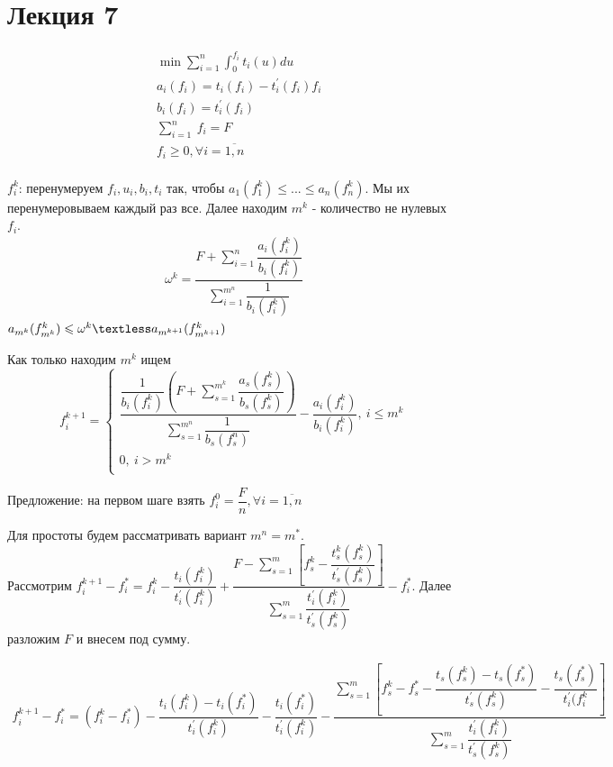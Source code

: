 \documentclass[12pt,a4paper,titlepage,oneside]{book}
\theoremstyle{definition}
\theoremstyle{plain}
\theoremstyle{remark}
\theoremstyle{remark}
\theoremstyle{plain}
\theoremstyle{plain}
\begin{document}
\chapter{Лекция 7}
\begin{align*}
&\min \sum\limits_{i=1}^n \int_{0}^{f_i} t_i(u)du\\
&a_i(f_i)=t_i(f_i)-t_i^{\prime} (f_i)f_i\\
&b_i(f_i)=t_i^{\prime} (f_i)\\
&\sum\limits_{i=1}^n\ f_i=F\\
&f_i \geqslant 0, \forall i= \overline{1,n}\\
\end{align*}

$f_i^k$: перенумеруем $f_i, u_i, b_i, t_i$ так, чтобы $a_1(f_1^k)\leqslant...\leqslant a_n(f_n^k)$. Мы их перенумеровываем каждый раз все. Далее находим $m^k$ - количество не нулевых $f_i.$ \\
\begin{align*}
\omega^k=\dfrac{F+\sum \limits_{i=1}^n\dfrac{a_i(f_i^k)}{b_i(f_i^k)}}{\sum \limits_{i=1}^{m^n} \dfrac{1}{b_i(f_i^k)}}
\end{align*}
$a_{m^k}(f_{m^k}^k) \leqslant \omega^k \textless a_{m^{k+1}}( f_{m^{k+1}}^k) $

Как только находим $m^k$ ищем 
\begin{equation*}
f_i^{k+1} = 
 \begin{cases}
  \dfrac{ \dfrac{1}{b_i(f_i^k)} (F+\sum \limits_{s=1}^{m^k} \dfrac{a_s(f_s^k)}{b_s(f_s^k)})}{\sum \limits_{s=1}^{m^n} \dfrac{1}{b_s(f_s^n)}} - \dfrac{a_i(f_i^k)}{b_i(f_i^k)}, \:  i\leqslant m^k\\
   0, \:  {i>m^k}\\
 \end{cases}
\end{equation*}

Предложение: на первом шаге взять $f_i^0 = \dfrac{F}{n}, \forall i=\overline{1,n}$

Для простоты будем рассматривать вариант $ m^n=m^* $.\\
Рассмотрим $f_i^{k+1}-f_i^*=f_i^k-\dfrac{t_i(f_i^k)}{t_i^{\prime} (f_i^k)}+\dfrac{F-\sum\limits_{s=1}^m \left[ f_s^k-\dfrac{t_s^k(f_s^k)}{t_s^{\prime} (f_s^k)}\right]}{\sum \limits_{s=1}^m \dfrac{t_i^{\prime} (f_i^k)}{t_s^{\prime} (f_s^k)}}-f_i^* $. Далее разложим $F$ и внесем под сумму. 

\begin{align*}
f_i^{k+1}-f_i^*=(f_i^k-f_i^*) - \dfrac{t_i(f_i^k)-t_i(f_i^*)}{t_i^{\prime} (f_i^k)}  - \dfrac{t_i(f_i^*)}{t_i^{\prime} (f_i^k)}- \dfrac{\sum \limits_{s=1}^m \left[ f_s^k-f_s^*-\dfrac{t_s(f_s^k)-t_s(f_s^*)}{t_s^{\prime} (f_s^k)}-\dfrac{t_s(f_s^*)}{t_i^{\prime} (f_i^k} \right ]}{\sum \limits_{s=1}^m \dfrac{t_i^{\prime} (f_i^k)}{t_s^{\prime} (f_s^k)}}
\end{align*}
\end{document}
